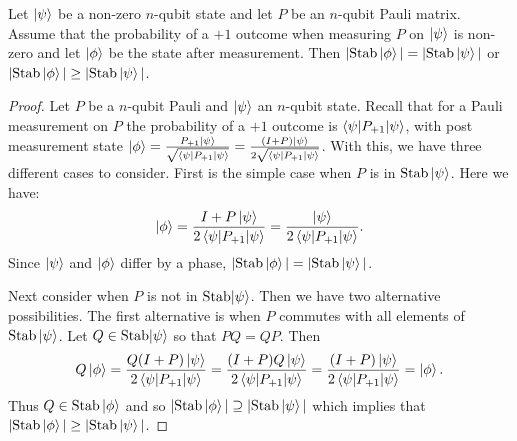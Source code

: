 \documentclass[12pt]{dalthesis}
\begin{document}
\begin{lemma}
\label{nullity outcome}
Let $\ket{\psi}$ be a non-zero $n$-qubit state and let $P$ be an $n$-qubit Pauli matrix. Assume that the probability of a $+1$ outcome when measuring $P$ on $\ket{\psi}$ is non-zero and let $\ket{\phi}$ be the state after measurement. Then $|\text{Stab}\ket{\phi}| = |\text{Stab}\ket{\psi}|$ or $|\text{Stab}\ket{\phi}| \geq |\text{Stab}\ket{\psi}|$.
\end{lemma}

\begin{proof}
Let $P$ be a $n$-qubit Pauli and $\ket{\psi}$ an $n$-qubit state. Recall that for a Pauli measurement on $P$ the probability of a $+1$ outcome is $\braket{\psi | P_{+1} | \psi}$, with post measurement state $\ket{\phi} = \frac{P_{+1} \ket{\psi}}{\sqrt{\braket{\psi | P_{+1} | \psi}}} =  \frac{(I+P) \ket{\psi}}{2 \sqrt{\braket{\psi | P_{+1} | \psi}}}$. With this, we have three different cases to consider. First is the simple case when $P$ is in $\mathrm{Stab}\ket{\psi}$. Here we have: 
\begin{equation*}
\ket{\phi} = \frac{I+P \ket{\psi}}{2\braket{\psi | P_{+1} | \psi}} = \frac{\ket{\psi}}{2\braket{\psi |P_{+1}| \psi}}.
\end{equation*}
Since $\ket{\psi}$ and $\ket{\phi}$ differ by a phase, $|\mathrm{Stab}\ket{\phi}| = |\mathrm{Stab}\ket{\psi}|$.

Next consider when $P$ is not in $\mathrm{Stab}{\ket{\psi}}$. Then we have two alternative possibilities. The first alternative is when $P$ commutes with all elements of $\mathrm{Stab}\ket{\psi}$. Let $Q \in \mathrm{Stab}{\ket{\psi}}$ so that $PQ = QP$. Then 
\begin{equation*}
Q\ket{\phi} = \frac{Q(I+P) \ket{\psi}}{2\braket{\psi | P_{+1} | \psi}} = \frac{(I+P)Q\ket{\psi}}{2\braket{\psi |P_{+1}| \psi}} = \frac{(I+P)\ket{\psi}}{2\braket{\psi |P_{+1}| \psi}} = \ket{\phi}.
\end{equation*}
Thus $Q \in \mathrm{Stab}\ket{\phi}$ and so $|\text{Stab}\ket{\phi}| \supseteq |\text{Stab}\ket{\psi}|$ which implies that $|\text{Stab}\ket{\phi}| \geq |\text{Stab}\ket{\psi}|$.


\end{proof}
\end{document}
